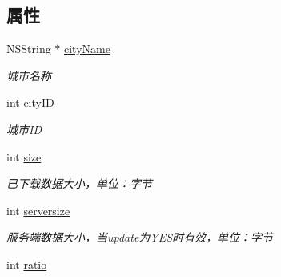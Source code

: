\subsection*{属性}
\begin{DoxyCompactItemize}
\item 
\hypertarget{interface_b_m_k_o_l_update_element_acf8998f896d5eee3bf25b5efaf316ffa}{}N\+S\+String $\ast$ \hyperlink{interface_b_m_k_o_l_update_element_acf8998f896d5eee3bf25b5efaf316ffa}{city\+Name}\label{interface_b_m_k_o_l_update_element_acf8998f896d5eee3bf25b5efaf316ffa}

\begin{DoxyCompactList}\small\item\em 城市名称 \end{DoxyCompactList}\item 
\hypertarget{interface_b_m_k_o_l_update_element_a0fc2ac335466b2fb891d1c3c430e14db}{}int \hyperlink{interface_b_m_k_o_l_update_element_a0fc2ac335466b2fb891d1c3c430e14db}{city\+I\+D}\label{interface_b_m_k_o_l_update_element_a0fc2ac335466b2fb891d1c3c430e14db}

\begin{DoxyCompactList}\small\item\em 城市\+I\+D \end{DoxyCompactList}\item 
\hypertarget{interface_b_m_k_o_l_update_element_a64207ce9d00c3127b02fbeaeb2dfc49c}{}int \hyperlink{interface_b_m_k_o_l_update_element_a64207ce9d00c3127b02fbeaeb2dfc49c}{size}\label{interface_b_m_k_o_l_update_element_a64207ce9d00c3127b02fbeaeb2dfc49c}

\begin{DoxyCompactList}\small\item\em 已下载数据大小，单位：字节 \end{DoxyCompactList}\item 
\hypertarget{interface_b_m_k_o_l_update_element_ad61b9f37f09ee7c2c2c41570c1329d1e}{}int \hyperlink{interface_b_m_k_o_l_update_element_ad61b9f37f09ee7c2c2c41570c1329d1e}{serversize}\label{interface_b_m_k_o_l_update_element_ad61b9f37f09ee7c2c2c41570c1329d1e}

\begin{DoxyCompactList}\small\item\em 服务端数据大小，当update为\+Y\+E\+S时有效，单位：字节 \end{DoxyCompactList}\item 
\hypertarget{interface_b_m_k_o_l_update_element_a8f26b0d8b91573b17f2314fe5795dcd4}{}int \hyperlink{interface_b_m_k_o_l_update_element_a8f26b0d8b91573b17f2314fe5795dcd4}{ratio}\label{interface_b_m_k_o_l_update_element_a8f26b0d8b91573b17f2314fe5795dcd4}


\end{DoxyCompactItemize}
